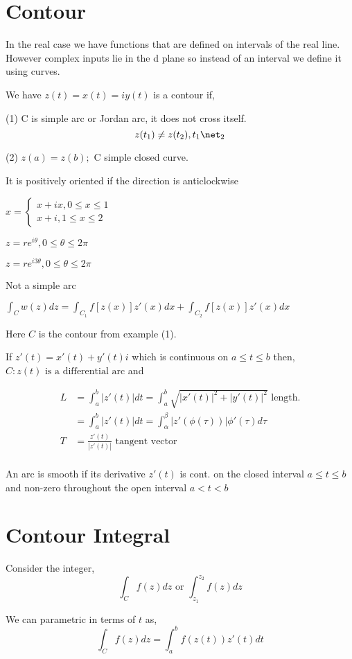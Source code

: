 \section{Contour}
In the real case we have functions that are defined on intervals of the real line. However complex inputs lie in the d plane so instead of an interval we define it using curves.
\begin{definition}[contour]
We have $z(t) = x(t) = iy(t)$ is a contour if, 

(1) C is simple arc or Jordan arc, it does not cross itself.
$$ z(t_1) \ne z(t_2), t_1\net_2 $$ 

(2) $z(a) = z(b); $ C simple closed curve.

It is positively oriented if the direction is anticlockwise
\end{definition}

\begin{eg}
   $ x = \begin{cases}x + ix, 0 \le x \le 1 \\ x + i, 1 \le x \le 2\end{cases} $
\end{eg}

\begin{eg}
   $z = re^{i\theta}, 0 \le \theta \le 2\pi$
\end{eg}

\begin{eg}
   $z = re^{i3\theta}, 0 \le \theta \le 2\pi$

   Not a simple arc 
\end{eg}

\begin{eg}
   $\int_C w(z) dz = \int_{C_1} f[z(x)]z'(x) dx + \int_{C_2}f[z(x)] z'(x)dx$

   Here $C$ is the contour from example (1).
\end{eg}


\begin{definition}
If $z'(t) = x'(t) + y'(t)i$ which is continuous on  $a \le t \le b$ then,  $C:z(t) \text{ is a differential arc}$ and 

\begin{align*}
   L &= \int_a^b |z'(t)|dt = \int_a^b \sqrt{|x'(t)|^2 + |y'(t)|^2} \text{ length.}\\
     &= \int_a^b |z'(t)|dt = \int_{\alpha}^{\beta} |z'(\phi(\tau))| \phi'(\tau)d\tau\\
   T &= \frac{z'(t)}{|z'(t)|} \text{ tangent vector}\\
\end{align*}

\end{definition}
\begin{definition}
   An arc is smooth if its derivative $z'(t)$ is cont. on the closed interval $a\le t \le b$ and non-zero throughout the open interval $a < t < b$
\end{definition}
   

\section{Contour Integral}
Consider the integer, 
$$ \int_C f(z) dz \text{ or } \int_{z_1}^{z_2} f(z) dz $$ 

We can parametric in terms of $t$ as, 
$$ \int_C f(z)dz = \int_a^b f(z(t))z'(t) dt $$ 






